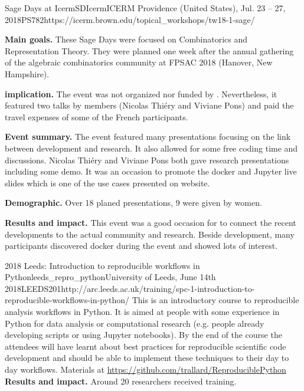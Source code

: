\begin{Aim 1}
\begin{Aim 2}
\begin{event}{Sage Days at Icerm}{SDIcerm}{ICERM Providence (United States), Jul. 23 -- 27, 2018}{PS}{78}{2}{https://icerm.brown.edu/topical_workshops/tw18-1-sage/}

\textbf{Main goals.} These Sage Days were focused on Combinatorics and Representation Theory. They were planned one week after the annual gathering of the algebraic combinatorics community at FPSAC 2018 (Hanover, New Hampshire).

\textbf{\ODK implication.} The event was not organized nor funded by \ODK. Nevertheless, it featured two talks by \ODK members (Nicolas Thiéry and Viviane Pons) and \ODK paid the travel expenses of some of the French participants.

\textbf{Event summary.} The event featured many presentations focusing on the link between \Sage development and research. It also allowed for some free coding time and discussions. Nicolas Thiéry and Viviane Pons both gave research presentations including some \Sage demo. It was an occasion to promote the \Sage docker and Jupyter live slides which is one of the use cases presented on \ODK website.

\textbf{Demographic.} Over 18 planed presentations, 9 were given by women.

\textbf{Results and impact.} This event was a good occasion for \ODK to connect the recent developments to the actual community and research. Beside \Sage development, many participants discovered docker during the event and showed lots of interest.

\end{event}

\begin{event}{2018 Leeds: Introduction to reproducible workflows in Python}{leeds_repro_python}{University of Leeds, June 14th 2018}{LEEDS}{20}{1}{http://arc.leeds.ac.uk/training/spc-1-introduction-to-reproducible-workflows-in-python/}
This is an introductory course to reproducible analysis workflows in Python. It is aimed at people with some experience in Python for data analysis or computational research (e.g. people already developing scripts or using Jupyter notebooks). By the end of the course the attendees will have learnt about best practices for reproducible scientific code development and should be able to implement these techniques to their day to day workflows.
Materials at \url{https://github.com/trallard/ReproduciblePython}
\textbf{Results and impact.} Around 20 researchers received training.


\end{event}
\end{Aim 2}
\end{Aim 1}
